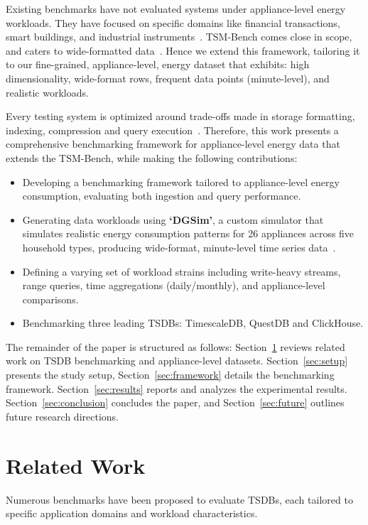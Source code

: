 \documentclass[conference]{IEEEtran}
\begin{document}
Existing benchmarks have not evaluated systems under appliance-level energy workloads. They have focused on specific domains like financial transactions, smart buildings, and industrial instruments~\cite{3_tsbs,4_smartbench2020,5_scits2022}. TSM-Bench comes close in scope, and caters to wide-formatted data~\cite{1_tsmbench2023}. Hence we extend this framework, tailoring it to our fine-grained, appliance-level, energy dataset that exhibits: high dimensionality, wide-format rows, frequent data points (minute-level), and realistic workloads.

Every testing system is optimized around trade-offs made in storage formatting, indexing, compression and query execution~\cite{1_tsmbench2023,2_tsmsurvey2017,6_clickbench}. Therefore, this work presents a comprehensive benchmarking framework for appliance-level energy data that extends the TSM-Bench, while making the following contributions:
\begin{itemize}
  \item Developing a benchmarking framework tailored to appliance-level energy consumption, evaluating both ingestion and query performance.
  \item Generating data workloads using \textbf{`DGSim'}, a custom simulator that simulates realistic energy consumption patterns for 26 appliances across five household types, producing wide-format, minute-level time series data~\cite{17_DGSim}.
  \item Defining a varying set of workload strains including write-heavy streams, range queries, time aggregations (daily/monthly), and appliance-level comparisons.
  \item Benchmarking three leading TSDBs: TimescaleDB, QuestDB and ClickHouse.
\end{itemize}

The remainder of the paper is structured as follows: Section~\ref{sec:related} reviews related work on TSDB benchmarking and appliance-level datasets. Section~\ref{sec:setup} presents the study setup, Section~\ref{sec:framework} details the benchmarking framework. Section~\ref{sec:results} reports and analyzes the experimental results. Section~\ref{sec:conclusion} concludes the paper, and Section~\ref{sec:future} outlines future research directions.


\section{Related Work}\label{sec:related}
Numerous benchmarks have been proposed to evaluate TSDBs, each tailored to specific application domains and workload characteristics.
\end{document}
